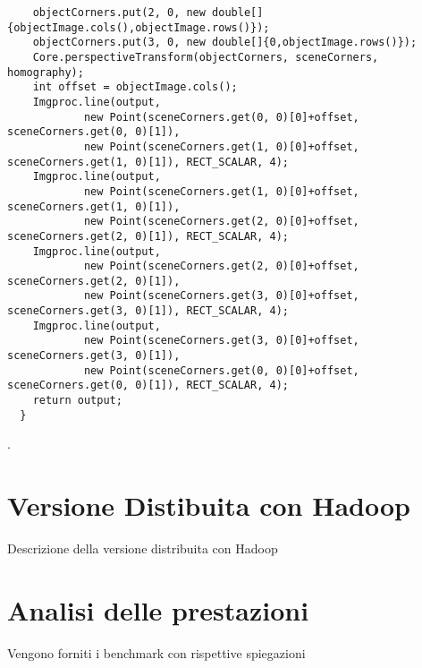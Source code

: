 \begin{itemize}
\begin{lstlisting}
    objectCorners.put(2, 0, new double[]{objectImage.cols(),objectImage.rows()});
    objectCorners.put(3, 0, new double[]{0,objectImage.rows()});
    Core.perspectiveTransform(objectCorners, sceneCorners, homography);
    int offset = objectImage.cols();
    Imgproc.line(output, 
            new Point(sceneCorners.get(0, 0)[0]+offset, sceneCorners.get(0, 0)[1]), 
            new Point(sceneCorners.get(1, 0)[0]+offset, sceneCorners.get(1, 0)[1]), RECT_SCALAR, 4);
    Imgproc.line(output, 
            new Point(sceneCorners.get(1, 0)[0]+offset, sceneCorners.get(1, 0)[1]), 
            new Point(sceneCorners.get(2, 0)[0]+offset, sceneCorners.get(2, 0)[1]), RECT_SCALAR, 4);
    Imgproc.line(output, 
            new Point(sceneCorners.get(2, 0)[0]+offset, sceneCorners.get(2, 0)[1]), 
            new Point(sceneCorners.get(3, 0)[0]+offset, sceneCorners.get(3, 0)[1]), RECT_SCALAR, 4);
    Imgproc.line(output, 
            new Point(sceneCorners.get(3, 0)[0]+offset, sceneCorners.get(3, 0)[1]), 
            new Point(sceneCorners.get(0, 0)[0]+offset, sceneCorners.get(0, 0)[1]), RECT_SCALAR, 4);
    return output;
  }
\end{lstlisting}
\end{itemize}.

\section{Versione Distibuita con Hadoop}
Descrizione della versione distribuita con Hadoop
\section{Analisi delle prestazioni}
Vengono forniti i benchmark con rispettive spiegazioni
